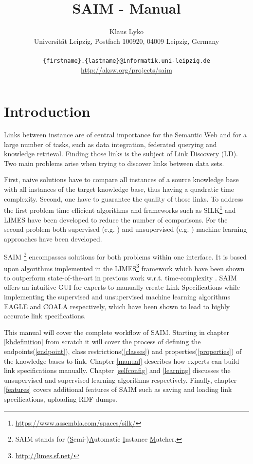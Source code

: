 \documentclass[oneside,a4paper,12pt]{memoir}
\begin{document}
\title{SAIM - Manual}
\author{Klaus Lyko \\  Universit\"at Leipzig, Postfach 100920, 04009 Leipzig, Germany\\\\
\texttt{\{firstname\}.\{lastname\}@informatik.uni-leipzig.de}\\
\url{http://aksw.org/projects/saim}}
                                              
\maketitle

\newpage
\tableofcontents*
\chapter{Introduction}
Links between instance are of central importance for the Semantic Web and for a large number of tasks, such as data integration, federated querying and knowledge retrieval. Finding those links is the subject of Link Discovery (LD).
Two main problems arise when trying to discover links between data sets.

First, naive solutions have to compare all instances of a source knowledge base with all instances of the target knowledge base, thus having a quadratic time complexity. Second, one have to guarantee the quality of those links. 
To address the first problem time efficient algorithms and frameworks such as SILK\footnote{\url{https://www.assembla.com/spaces/silk/}} and LIMES\cite{NGAU11} have been developed to reduce the number of comparisons. For the second problem both supervised (e.g. \cite{NGLY12, NGO+13}) and unsupervised ({e.g. \cite{NIK+12}}) machine learning approaches have been developed.

SAIM \footnote{SAIM stands for (\uline{S}emi-)\uline{A}utomatic \uline{I}nstance \uline{M}atcher.}  encompasses solutions for both problems within one interface. It is based upon algorithms implemented in the LIMES\footnote{\url{http://limes.sf.net/}} framework which have been shown to outperform state-of-the-art in previous work w.r.t. time-complexity \cite{NGON12c}. SAIM offers an intuitive GUI for experts to manually create Link Specifications while implementing the supervised and unsupervised machine learning algorithms EAGLE \cite{NGLY12}	and COALA \cite{NGO+13} respectively, which have been shown to lead to highly accurate link specifications.

This manual will cover the complete workflow of SAIM. Starting in chapter \ref{kbdefinition} from scratch it will cover the process of defining the endpoints(\ref{endpoint}), class restrictions(\ref{classes}) and properties(\ref{properties}) of the knowledge bases to link. Chapter \ref{manual} describes how experts can build link specifications manually. Chapter \ref{selfconfig} and \ref{learning} discusses the unsupervised and supervised learning algorithms respectively. Finally, chapter \ref{features} covers additional features of SAIM such as saving and loading link specifications, uploading RDF dumps.
\end{document}
